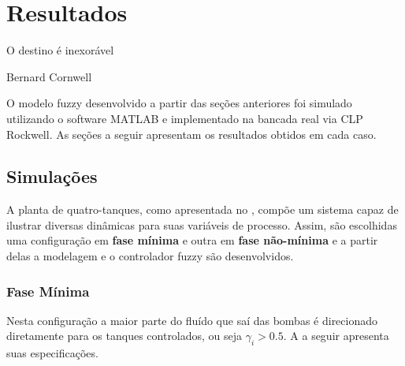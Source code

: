 %

\chapter{Resultados} \label{capRes}
\epigraph{O destino é inexorável}{Bernard Cornwell}

O modelo fuzzy desenvolvido a partir das seções anteriores foi simulado utilizando o software MATLAB e implementado na bancada real via CLP Rockwell. As seções a seguir apresentam os resultados obtidos em cada caso.

\section{Simulações} \label{secAnalise}
A planta de quatro-tanques, como apresentada no , compõe um sistema capaz de ilustrar diversas dinâmicas para suas variáveis de processo. Assim, são escolhidas uma configuração em \textbf{fase mínima }e outra em \textbf{fase não-mínima} e a partir delas a modelagem e o controlador fuzzy são desenvolvidos. 

\subsection{Fase Mínima}
Nesta configuração a maior parte do fluído que saí das bombas é direcionado diretamente para os tanques controlados, ou seja $\gamma_i > 0.5$. A  a seguir apresenta suas especificações.

\begin{table}[!ht]
	\caption{Parâmetros da planta em fase mínima.}
	\label{tabFaseMinima}
	\small
	\centering
\end{table}

